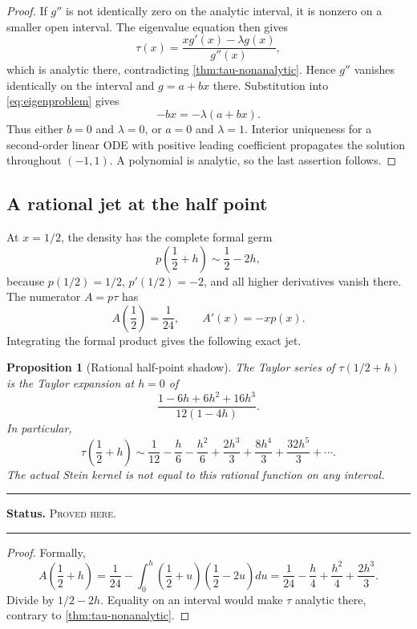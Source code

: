 \documentclass[11pt,oneside]{article}
\newtheorem{proposition}[theorem]{Proposition}
\theoremstyle{definition}
\theoremstyle{remark}
\newenvironment{boxedremark}{%
  \par\smallskip\noindent\begin{center}\begin{minipage}{0.94\textwidth}%
  \color{black}\hrule\vspace{0.6em}\small
}{%
  \vspace{0.6em}\hrule\end{minipage}\end{center}\smallskip
}
\newcommand{\ProvedHere}{\textsc{Proved here}}
\newcommand{\Status}[1]{%
  \begin{boxedremark}\textbf{Status.} #1.\end{boxedremark}}
\begin{document}
\begin{proof}
If $g''$ is not identically zero on the analytic interval, it is nonzero on a
smaller open interval.  The eigenvalue equation then gives
\begin{equation}\label{eq:tau-from-eigen}
 \tau(x)=\frac{xg'(x)-\lambda g(x)}{g''(x)},
\end{equation}
which is analytic there, contradicting \cref{thm:tau-nonanalytic}.  Hence $g''$
vanishes identically on the interval and $g=a+bx$ there.  Substitution into
\eqref{eq:eigenproblem} gives
\[
 -bx=-\lambda(a+bx).
\]
Thus either $b=0$ and $\lambda=0$, or $a=0$ and $\lambda=1$.  Interior uniqueness
for a second-order linear ODE with positive leading coefficient propagates the
solution throughout $(-1,1)$.  A polynomial is analytic, so the last assertion
follows.
\end{proof}

\subsection{A rational jet at the half point}
At $x=1/2$, the density has the complete formal germ
\[
 p\!\left(\frac12+h\right)\sim\frac12-2h,
\]
because $p(1/2)=1/2$, $p'(1/2)=-2$, and all higher derivatives vanish there.
The numerator $A=p\tau$ has
\[
 A\!\left(\frac12\right)=\frac1{24},
 \qquad A'(x)=-xp(x).
\]
Integrating the formal product gives the following exact jet.

\begin{proposition}[Rational half-point shadow]\label{prop:tau-half-jet}
The Taylor series of $\tau(1/2+h)$ is the Taylor expansion at $h=0$ of
\begin{equation}\label{eq:tau-half-rational}
 \frac{1-6h+6h^2+16h^3}{12(1-4h)}.
\end{equation}
In particular,
\[
 \tau\!\left(\frac12+h\right)
 \sim \frac1{12}-\frac h6-\frac{h^2}{6}
       +\frac{2h^3}{3}+\frac{8h^4}{3}+\frac{32h^5}{3}+\cdots.
\]
The actual Stein kernel is not equal to this rational function on any interval.
\end{proposition}
\Status{\ProvedHere}

\begin{proof}
Formally,
\[
 A\!\left(\frac12+h\right)
 =\frac1{24}-\int_0^h\left(\frac12+u\right)
                 \left(\frac12-2u\right)du
 =\frac1{24}-\frac h4+\frac{h^2}{4}+\frac{2h^3}{3}.
\]
Divide by $1/2-2h$.  Equality on an interval would make $\tau$ analytic there,
contrary to \cref{thm:tau-nonanalytic}.
\end{proof}
\end{document}
